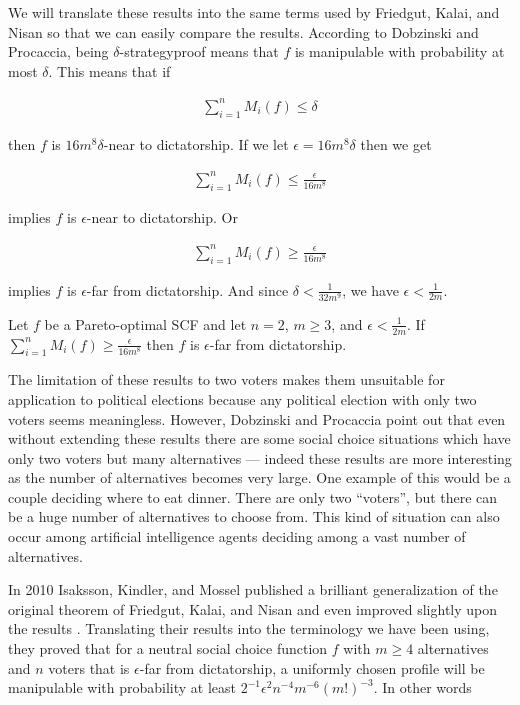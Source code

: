 	We will translate these results into the same terms used by Friedgut, Kalai, and Nisan so that we can easily compare the results. According to Dobzinski and Procaccia, being $\delta$-strategyproof means that $f$ is manipulable with probability at most $\delta$. This means that if

	\begin{align*}
		\sum_{i=1}^n M_i(f) \le \delta
	\end{align*}

	then $f$ is $16m^8 \delta$-near to dictatorship. If we let $\epsilon = 16m^8 \delta$ then we get

	\begin{align*}
		\sum_{i=1}^n M_i(f) \le \frac{\epsilon}{16m^8}
	\end{align*}

	implies $f$ is $\epsilon$-near to dictatorship. Or

	\begin{align*}
		\sum_{i=1}^n M_i(f) \ge \frac{\epsilon}{16m^8}
	\end{align*}

	implies $f$ is $\epsilon$-far from dictatorship. And since $\delta < \frac{1}{32m^9}$, we have $\epsilon < \frac{1}{2m}$.

	\begin{theorem}
		Let $f$ be a Pareto-optimal SCF and let $n = 2$, $m \ge 3$, and $\epsilon < \frac{1}{2m}$. If $\sum_{i=1}^n M_i(f) \ge \frac{\epsilon}{16m^8}$ then $f$ is $\epsilon$-far from dictatorship.
	\end{theorem}

	The limitation of these results to two voters makes them unsuitable for application to political elections because any political election with only two voters seems meaningless. However, Dobzinski and Procaccia point out that even without extending these results there are some social choice situations which have only two voters but many alternatives --- indeed these results are more interesting as the number of alternatives becomes very large. One example of this would be a couple deciding where to eat dinner. There are only two ``voters'', but there can be a huge number of alternatives to choose from. This kind of situation can also occur among artificial intelligence agents deciding among a vast number of alternatives.

	In 2010 Isaksson, Kindler, and Mossel published a brilliant generalization of the original theorem of Friedgut, Kalai, and Nisan and even improved slightly upon the results \cite{isaksson2010geometry}. Translating their results into the terminology we have been using, they proved that for a neutral social choice function $f$ with $m \ge 4$ alternatives and $n$ voters that is $\epsilon$-far from dictatorship, a uniformly chosen profile will be manipulable with probability at least $2^{-1} \epsilon^2 n^{-4} m^{-6} (m!)^{-3}$. In other words

